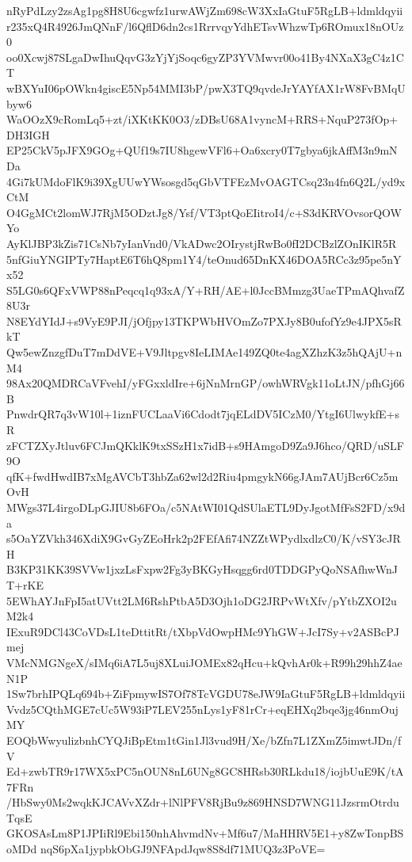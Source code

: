 nRyPdLzy2zsAg1pg8H8U6cgwfz1urwAWjZm698cW3XxIaGtuF5RgLB+ldmldqyii
r235xQ4R4926JmQNnF/l6QflD6dn2cs1RrrvqyYdhETsvWhzwTp6ROmux18nOUz0
oo0Xcwj87SLgaDwIhuQqvG3zYjYjSoqc6gyZP3YVMwvr00o41By4NXaX3gC4z1CT
wBXYuI06pOWkn4giscE5Np54MMI3bP/pwX3TQ9qvdeJrYAYfAX1rW8FvBMqUbyw6
WaOOzX9cRomLq5+zt/iXKtKK0O3/zDBsU68A1vyncM+RRS+NquP273fOp+DH3IGH
EP25CkV5pJFX9GOg+QUf19s7IU8hgewVFl6+Oa6xcry0T7gbya6jkAffM3n9mNDa
4Gi7kUMdoFlK9i39XgUUwYWsosgd5qGbVTFEzMvOAGTCsq23n4fn6Q2L/yd9xCtM
O4GgMCt2lomWJ7RjM5ODztJg8/Ysf/VT3ptQoEIitroI4/c+S3dKRVOvsorQOWYo
AyKlJBP3kZis71CsNb7yIanVnd0/VkADwc2OIrystjRwBo0fI2DCBzlZOnIKlR5R
5nfGiuYNGIPTy7HaptE6T6hQ8pm1Y4/teOnud65DnKX46DOA5RCc3z95pe5nYx52
S5LG0s6QFxVWP88nPeqcq1q93xA/Y+RH/AE+l0JccBMmzg3UaeTPmAQhvafZ8U3r
N8EYdYIdJ+s9VyE9PJI/jOfjpy13TKPWbHVOmZo7PXJy8B0ufofYz9e4JPX5sRkT
Qw5ewZnzgfDuT7mDdVE+V9Jltpgv8IeLIMAe149ZQ0te4agXZhzK3z5hQAjU+nM4
98Ax20QMDRCaVFvehI/yFGxxldIre+6jNnMrnGP/owhWRVgk11oLtJN/pfhGj66B
PnwdrQR7q3vW10l+1iznFUCLaaVi6Cdodt7jqELdDV5ICzM0/YtgI6UlwykfE+sR
zFCTZXyJtluv6FCJmQKklK9txSSzH1x7idB+s9HAmgoD9Za9J6hco/QRD/uSLF9O
qfK+fwdHwdIB7xMgAVCbT3hbZa62wl2d2Riu4pmgykN66gJAm7AUjBcr6Cz5mOvH
MWgs37L4irgoDLpGJIU8b6FOa/c5NAtWI01QdSUlaETL9DyJgotMfFsS2FD/x9da
s5OaYZVkh346XdiX9GvGyZEoHrk2p2FEfAfi74NZZtWPydlxdlzC0/K/vSY3cJRH
B3KP31KK39SVVw1jxzLsFxpw2Fg3yBKGyHsqgg6rd0TDDGPyQoNSAfhwWnJT+rKE
5EWhAYJnFpI5atUVtt2LM6RshPtbA5D3Ojh1oDG2JRPvWtXfv/pYtbZXOI2uM2k4
IExuR9DCl43CoVDsL1teDttitRt/tXbpVdOwpHMc9YhGW+JcI7Sy+v2ASBcPJmej
VMcNMGNgeX/sIMq6iA7L5uj8XLuiJOMEx82qHcu+kQvhAr0k+R99h29hhZ4aeN1P
1Sw7brhIPQLq694b+ZiFpmywIS7Of78TcVGDU78eJW9IaGtuF5RgLB+ldmldqyii
Vvdz5CQthMGE7cUc5W93iP7LEV255nLys1yF81rCr+eqEHXq2bqe3jg46nmOujMY
EOQbWwyulizbnhCYQJiBpEtm1tGin1Jl3vud9H/Xe/bZfn7L1ZXmZ5imwtJDn/fV
Ed+zwbTR9r17WX5xPC5nOUN8nL6UNg8GC8HRsb30RLkdu18/iojbUuE9K/tA7FRn
/HbSwy0Ms2wqkKJCAVvXZdr+lNlPFV8RjBu9z869HNSD7WNG11JzsrmOtrduTqsE
GKOSAsLm8P1JPIiRl9Ebi150nhAhvmdNv+Mf6u7/MaHHRV5E1+y8ZwTonpBSoMDd
nqS6pXa1jypbkObGJ9NFApdJqw8S8df71MUQ3z3PoVE=
